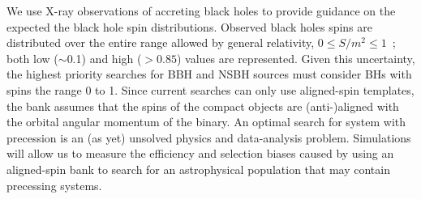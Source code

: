 We use X-ray observations of accreting black holes to provide guidance on the
expected the black hole spin distributions.  Observed black holes spins are
distributed over the entire range allowed by general relativity, $0 \le S/m^2
\le 1$~\cite{Miller:2009cw,Shafee:2005ef,
McClintock:2006xd,Liu:2008tk,Gou:2009ks,Davis:2006cm,Li:2004aq}; both low
($\sim$0.1) \cite{McClintock:2011zq} and high ($>0.85$) values
\cite{McClintock:2013vwa} are represented.  Given this uncertainty, the
highest priority searches for BBH and NSBH sources must consider BHs with
spins the range 0 to 1. Since current searches can only use aligned-spin
templates, the bank assumes that the spins of the compact objects are
(anti-)aligned with the orbital angular momentum of the binary. An optimal
search for system with precession is an (as yet) unsolved physics and
data-analysis problem. Simulations will allow us to measure the efficiency and
selection biases caused by using an aligned-spin bank to search for an
astrophysical population that may contain precessing systems.   

